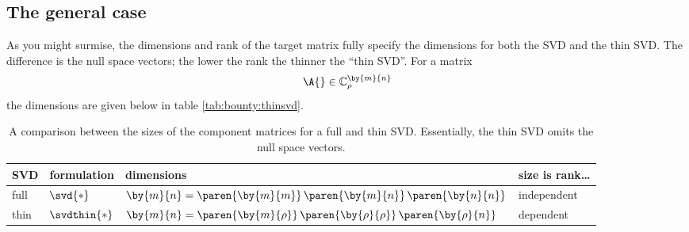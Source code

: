 \subsection{The general case}
As you might surmise, the dimensions and rank of the target matrix fully specify the dimensions for both the SVD and the thin SVD. The difference is the null space vectors; the lower the rank the thinner the ``thin SVD''. For a matrix 
\begin{equation}
  \A{}\in \mathbb{C}^{\by{m}{n}}_{\rho}
\end{equation}
the dimensions are given below in table \eqref{tab:bounty:thinsvd}.

\begin{table}[htdp]
\begin{center}
\begin{tabular}{llll}
SVD\quad & formulation & dimensions & size is rank\dots \\\hline
full & $\svd{*}$ & $\by{m}{n} = \paren{\by{m}{m}}\,\paren{\by{m}{n}}\,\paren{\by{n}{n}}$ & independent \\
thin & $\svdthin{*}$ & $\by{m}{n} = \paren{\by{m}{\rho}}\,\paren{\by{\rho}{\rho}}\,\paren{\by{\rho}{n}}$ & dependent 
\end{tabular}
\end{center}
\label{tab:bounty:thinsvd}
\caption[Dimensions for full and thin SVDs]{A comparison between the sizes of the component matrices for a full and thin SVD. Essentially, the thin SVD omits the null space vectors.}
\end{table}%

\endinput